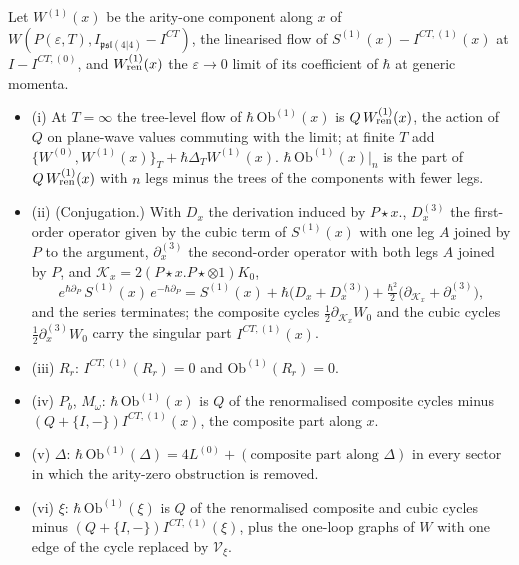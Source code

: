 \begin{theorem}
\label{thm:c12-second}
Let $W^{(1)}(x)$ be the arity-one component along $x$ of $W(P(\varepsilon,T),I_{\mathfrak{psl}(4|4)}-I^{CT})$, the linearised flow of $S^{(1)}(x)-I^{CT,(1)}(x)$ at $I-I^{CT,(0)}$, and $W^{(1)}_{\rm ren}(x)$ the $\varepsilon\to0$ limit of its coefficient of $\hbar$ at generic momenta.
\begin{itemize}
\item (i) At $T=\infty$ the tree-level flow of $\hbar\,\mathrm{Ob}^{(1)}(x)$ is $Q\,W^{(1)}_{\rm ren}(x)$, the action of $Q$ on plane-wave values commuting with the limit; at finite $T$ add $\{W^{(0)},W^{(1)}(x)\}_T+\hbar\Delta_TW^{(1)}(x)$. $\hbar\,\mathrm{Ob}^{(1)}(x)|_n$ is the part of $Q\,W^{(1)}_{\rm ren}(x)$ with $n$ legs minus the trees of the components with fewer legs.
\item (ii) (Conjugation.) With $D_x$ the derivation induced by $P\star x.$, $D^{(3)}_x$ the first-order operator given by the cubic term of $S^{(1)}(x)$ with one leg $A$ joined by $P$ to the argument, $\partial^{(3)}_x$ the second-order operator with both legs $A$ joined by $P$, and $\mathcal K_x=2(P\star x.P\star\otimes1)K_0$,
\begin{equation}
e^{\hbar\partial_P}\,S^{(1)}(x)\,e^{-\hbar\partial_P}=S^{(1)}(x)+\hbar\big(D_x+D^{(3)}_x\big)+\tfrac{\hbar^2}2\big(\partial_{\mathcal K_x}+\partial^{(3)}_x\big),
\label{eq:c12-conj}
\end{equation}
and the series terminates; the composite cycles $\tfrac12\partial_{\mathcal K_x}W_0$ and the cubic cycles $\tfrac12\partial^{(3)}_xW_0$ carry the singular part $I^{CT,(1)}(x)$.
\item (iii) $R_r$: $I^{CT,(1)}(R_r)=0$ and $\mathrm{Ob}^{(1)}(R_r)=0$.
\item (iv) $P_b$, $M_\omega$: $\hbar\,\mathrm{Ob}^{(1)}(x)$ is $Q$ of the renormalised composite cycles minus $(Q+\{I,-\})I^{CT,(1)}(x)$, the composite part along $x$.
\item (v) $\Delta$: $\hbar\,\mathrm{Ob}^{(1)}(\Delta)=4L^{(0)}+(\text{composite part along }\Delta)$ in every sector in which the arity-zero obstruction is removed.
\item (vi) $\xi$: $\hbar\,\mathrm{Ob}^{(1)}(\xi)$ is $Q$ of the renormalised composite and cubic cycles minus $(Q+\{I,-\})I^{CT,(1)}(\xi)$, plus the one-loop graphs of $W$ with one edge of the cycle replaced by $\mathcal V_\xi$.
\end{itemize}
\end{theorem}

